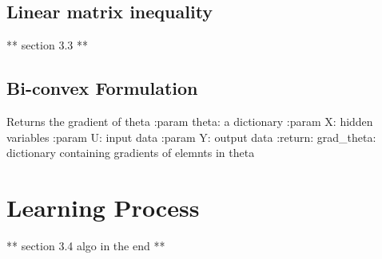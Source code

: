 \documentclass[letterpaper,10pt,english]{sphinxmanual}
\begin{document}
\section{Linear matrix inequality}
\label{\detokenize{sections/bi_convex_formulation:linear-matrix-inequality}}
** section 3.3 **


\section{Bi-convex Formulation}
\label{\detokenize{sections/bi_convex_formulation:module-utilities.GradientDescents}}\label{\detokenize{sections/bi_convex_formulation:bi-convex-formulation}}

\begin{fulllineitems}
\label{\detokenize{sections/bi_convex_formulation:utilities.GradientDescents.gradient_descent_theta}}
Returns the gradient of theta
:param theta: a dictionary
:param X: hidden variables
:param U: input data
:param Y: output data
:return: grad\_theta: dictionary containing gradients of elemnts in theta

\end{fulllineitems}



\chapter{Learning Process}
\label{\detokenize{sections/learning:learning-process}}\label{\detokenize{sections/learning:learning}}\label{\detokenize{sections/learning::doc}}
** section 3.4 algo in the end **
\end{document}
